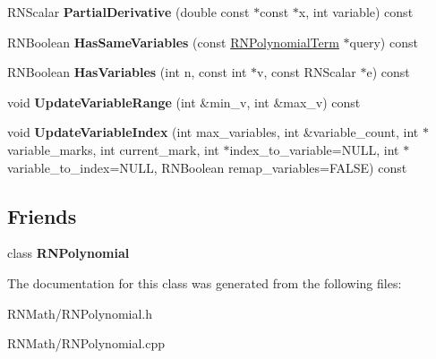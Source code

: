 \begin{DoxyCompactItemize}
\item 
R\+N\+Scalar {\bfseries Partial\+Derivative} (double const $\ast$const $\ast$x, int variable) const \hypertarget{class_r_n_polynomial_term_aa19525c02d5d120d46d98dd51eec74c5}{}\label{class_r_n_polynomial_term_aa19525c02d5d120d46d98dd51eec74c5}

\item 
R\+N\+Boolean {\bfseries Has\+Same\+Variables} (const \hyperlink{class_r_n_polynomial_term}{R\+N\+Polynomial\+Term} $\ast$query) const \hypertarget{class_r_n_polynomial_term_a8fa6085e75acc011aba221715c5434a1}{}\label{class_r_n_polynomial_term_a8fa6085e75acc011aba221715c5434a1}

\item 
R\+N\+Boolean {\bfseries Has\+Variables} (int n, const int $\ast$v, const R\+N\+Scalar $\ast$e) const \hypertarget{class_r_n_polynomial_term_a500c4b7c394c141bcc8f21877fe705f9}{}\label{class_r_n_polynomial_term_a500c4b7c394c141bcc8f21877fe705f9}

\item 
void {\bfseries Update\+Variable\+Range} (int \&min\+\_\+v, int \&max\+\_\+v) const \hypertarget{class_r_n_polynomial_term_a23e1a6f850423548705d6c5af3b324a4}{}\label{class_r_n_polynomial_term_a23e1a6f850423548705d6c5af3b324a4}

\item 
void {\bfseries Update\+Variable\+Index} (int max\+\_\+variables, int \&variable\+\_\+count, int $\ast$variable\+\_\+marks, int current\+\_\+mark, int $\ast$index\+\_\+to\+\_\+variable=N\+U\+LL, int $\ast$variable\+\_\+to\+\_\+index=N\+U\+LL, R\+N\+Boolean remap\+\_\+variables=F\+A\+L\+SE) const \hypertarget{class_r_n_polynomial_term_aac12e2a1d9bae2b7f05669810af5a5a7}{}\label{class_r_n_polynomial_term_aac12e2a1d9bae2b7f05669810af5a5a7}

\end{DoxyCompactItemize}
\subsection*{Friends}
\begin{DoxyCompactItemize}
\item 
class {\bfseries R\+N\+Polynomial}\hypertarget{class_r_n_polynomial_term_aa2266c2992445605f1b1fb3d82e395a8}{}\label{class_r_n_polynomial_term_aa2266c2992445605f1b1fb3d82e395a8}

\end{DoxyCompactItemize}


The documentation for this class was generated from the following files\+:\begin{DoxyCompactItemize}
\item 
R\+N\+Math/R\+N\+Polynomial.\+h\item 
R\+N\+Math/R\+N\+Polynomial.\+cpp\end{DoxyCompactItemize}
